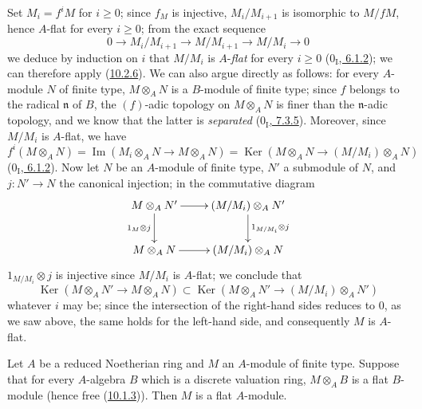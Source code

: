 Set $M_i=f^iM$ for $i\geq0$; since $f_M$ is injective,
$M_i/M_{i+1}$ is isomorphic to $M/fM$, hence $A$-flat for every $i\geq0$; from
the exact sequence
\[
  0\longrightarrow M_i/M_{i+1}\longrightarrow M/M_{i+1}
  \longrightarrow M/M_i\longrightarrow0
\]
we deduce by induction on $i$ that $M/M_i$ is $A$-\emph{flat} for every
$i\geq0$ (\hyperref[0.6.1.2]{$0_{\mathrm I}$, 6.1.2}); we can therefore
apply (\hyperref[0.10.2.6]{10.2.6}). We can also argue directly
as follows: for every $A$-module $N$ of finite type, $M\otimes_A N$ is a
$B$-module of finite type; since $f$ belongs to the radical $\mathfrak n$ of
$B$, the $(f)$-adic topology on $M\otimes_A N$ is finer than the
$\mathfrak n$-adic topology, and we know that the latter is \emph{separated}
(\hyperref[0.7.3.5]{$0_{\mathrm I}$, 7.3.5}). Moreover, since $M/M_i$ is
$A$-flat, we have
\[
  f^i(M\otimes_A N)=\operatorname{Im}(M_i\otimes_A N\to M\otimes_A N)
  =\operatorname{Ker}(M\otimes_A N\to(M/M_i)\otimes_A N)
\]
(\hyperref[0.6.1.2]{$0_{\mathrm I}$, 6.1.2}). Now let $N$ be an
$A$-module of finite type, $N'$ a submodule of $N$, and $j:N'\to N$ the canonical
injection; in the commutative diagram
\[
\xymatrix{
  M\otimes_A N'\ar[r]\ar[d]_{1_M\otimes j} &
  (M/M_i)\otimes_A N'\ar[d]^{1_{M/M_i}\otimes j}\\
  M\otimes_A N\ar[r] & (M/M_i)\otimes_A N
}
\]
$1_{M/M_i}\otimes j$ is injective since $M/M_i$ is $A$-flat; we
conclude that
\[
  \operatorname{Ker}(M\otimes_A N'\to M\otimes_A N)
  \subset\operatorname{Ker}(M\otimes_A N'\to(M/M_i)\otimes_A N')
\]
whatever $i$ may be; since the intersection of the right-hand sides reduces to
$0$, as we saw above, the same holds for the left-hand side, and
consequently $M$ is $A$-flat.

\begin{proposition}[10.2.8]
\label{0.10.2.8}
Let $A$ be a reduced Noetherian ring and $M$ an $A$-module of finite type.
Suppose that for every $A$-algebra $B$ which is a discrete valuation
ring, $M\otimes_A B$ is a flat $B$-module (hence free
(\hyperref[0.10.1.3]{10.1.3})). Then $M$ is a flat $A$-module.
\end{proposition}

